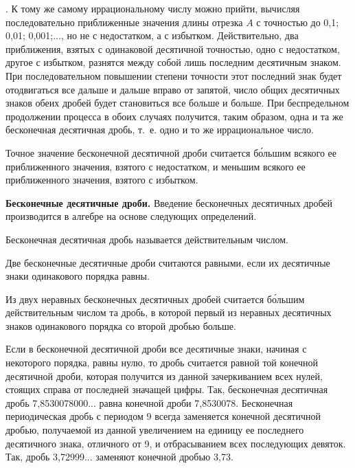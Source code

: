 \documentclass[oneside]{book}
\begin{document}
.
К тому же самому иррациональному числу можно прийти, вычисляя последовательно приближенные значения длины отрезка $A$ с точностью до 0,1;
0,01;
0,001;..., но не с недостатком, а с избытком.
Действительно, два приближения, взятых с одинаковой десятичной точностью, одно с недостатком, другое с избытком, разнятся между собой лишь последним десятичным знаком.
При последовательном повышении степени точности этот последний знак будет отодвигаться все дальше и дальше вправо от запятой, число общих десятичных знаков обеих дробей будет становиться все больше и больше.
При беспредельном продолжении процесса в обоих случаях получится, таким образом, одна и та же бесконечная десятичная дробь, т.~е.
одно и то же иррациональное число.

Точное значение бесконечной десятичной дроби считается б\'{о}льшим всякого ее приближенного значения, взятого с недостатком, и меньшим всякого ее приближенного значения, взятого с избытком.

\textbf{Бесконечные десятичные дроби.}
Введение бесконечных десятичных дробей производится в алгебре на основе следующих определений.

Бесконечная десятичная дробь называется действительным числом.

Две бесконечные десятичные дроби считаются равными, если их десятичные знаки одинакового порядка равны.

Из двух неравных бесконечных десятичных дробей считается б\'{о}льшим действительным числом та дробь, в которой первый из неравных десятичных знаков одинакового порядка со второй дробью больше.

Если в бесконечной десятичной дроби все десятичные знаки, начиная с некоторого порядка, равны нулю, то дробь считается равной той конечной десятичной дроби, которая получится из данной зачеркиванием всех нулей, стоящих справа от последней значащей цифры.
Так, бесконечная десятичная дробь 7,8530078000...
равна конечной дроби 7,8530078.
Бесконечная периодическая дробь с периодом 9 всегда заменяется конечной десятичной дробью, получаемой из данной увеличением на единицу ее последнего десятичного знака, отличного от 9, и отбрасыванием всех последующих девяток.
Так, дробь 3,72999...
заменяют конечной дробью 3,73.
\end{document}

